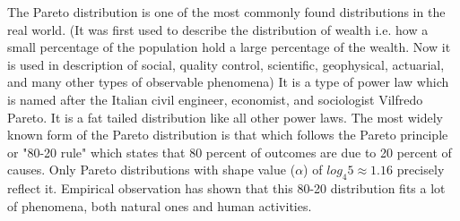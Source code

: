 \documentclass[14pt, a4paper]{article}
\theoremstyle{definition}
\begin{document}
The Pareto distribution is one of the most commonly found distributions in the real world. (It was first used to describe the distribution of wealth i.e. how a small percentage of the population hold a large percentage of the wealth. Now it is used in description of social, quality control, scientific, geophysical, actuarial, and many other types of observable phenomena) It is a type of power law which is named after the Italian civil engineer, economist, and sociologist Vilfredo Pareto. It is a fat tailed distribution like all other power laws. The most widely known form of the Pareto distribution is that which follows the Pareto principle or "80-20 rule" which states that 80 percent of outcomes are due to 20 percent of causes. Only Pareto distributions with shape value ($\alpha$) of $log_4 5 \approx 1.16$ precisely reflect it. Empirical observation has shown that this 80-20 distribution fits a lot of phenomena, both natural ones and human activities.
\end{document}
